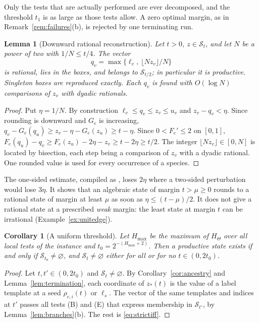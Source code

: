 \documentclass[11pt,a4paper]{article}
\theoremstyle{plain}
\newtheorem{lemma}[theorem]{Lemma}
\newtheorem{corollary}[theorem]{Corollary}
\theoremstyle{definition}
\theoremstyle{remark}
\newcommand{\St}{\mathcal{S}_t}
\newcommand{\Sset}[1]{\mathcal{S}_{#1}}
\begin{document}
Only the tests that are actually performed are ever decomposed, and the threshold $t_1$ is as large as those tests allow. A zero optimal margin, as in Remark~\ref{rem:failures}(b), is rejected by one terminating run.

\begin{lemma}[Downward rational reconstruction]\label{lem:round}
Let $t>0$, $z\in\St$, and let $N$ be a power of two with $1/N\le t/4$. The vector
\[
   q_v=\max\bigl\{\ell_v,\ \lfloor Nz_v\rfloor/N\bigr\}
\]
is rational, lies in the boxes, and belongs to $\Sset{t/2}$; in particular it is productive. Singleton boxes are reproduced exactly. Each $q_v$ is found with $O(\log N)$ comparisons of $z_v$ with dyadic rationals.
\end{lemma}
\begin{proof}
Put $\eta=1/N$. By construction $\ell_v\le q_v\le z_v\le u_v$ and $z_v-q_v<\eta$. Since rounding is downward and $G_e$ is increasing, $q_v-G_e(q_u)\ge z_v-\eta-G_e(z_u)\ge t-\eta$. Since $0<F_e'\le2$ on $[0,1]$, $F_e(q_u)-q_v\ge F_e(z_u)-2\eta-z_v\ge t-2\eta\ge t/2$. The integer $\lfloor Nz_v\rfloor\in[0,N]$ is located by bisection, each step being a comparison of $z_v$ with a dyadic rational. One rounded value is used for every occurrence of a species.
\end{proof}

The one-sided estimate, compiled as , loses $2\eta$ where a two-sided perturbation would lose $3\eta$. It shows that an algebraic state of margin $t>\mu\ge0$ rounds to a rational state of margin at least $\mu$ as soon as $\eta\le(t-\mu)/2$. It does not give a rational state at a prescribed \emph{weak} margin: the least state at margin $t$ can be irrational (Example~\ref{ex:unitedge}).

\begin{corollary}[A uniform threshold]\label{cor:uniform}
Let $H_{\max}$ be the maximum of $H_\Theta$ over \emph{all} local tests of the instance and $t_0=2^{-(H_{\max}+2)}$. Then a productive state exists if and only if $\Sset{t_0}\neq\varnothing$, and $\St\ne\varnothing$ either for all or for no $t\in(0,2t_0)$.
\end{corollary}
\begin{proof}
Let $t,t'\in(0,2t_0)$ and $\St\neq\varnothing$. By Corollary~\ref{cor:ancestry} and Lemma~\ref{lem:termination}, each coordinate of $z_*(t)$ is the value of a label template at a seed $\rho_{c,i}(t)$ or $\ell_s$. The vector of the same templates and indices at $t'$ passes all tests (B) and (E) that express membership in $\Sset{t'}$, by Lemma~\ref{lem:branches}(b). The rest is \eqref{eq:strictiff}.
\end{proof}
\end{document}
